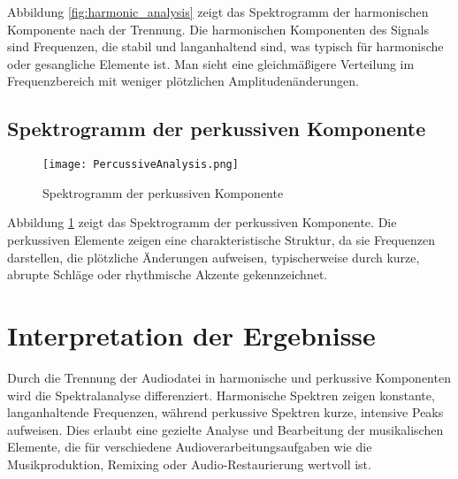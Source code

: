 Abbildung \ref{fig:harmonic_analysis} zeigt das Spektrogramm der harmonischen Komponente nach der Trennung. Die harmonischen Komponenten des Signals sind Frequenzen, die stabil und langanhaltend sind, was typisch für harmonische oder gesangliche Elemente ist. Man sieht eine gleichmäßigere Verteilung im Frequenzbereich mit weniger plötzlichen Amplitudenänderungen.

\subsection{Spektrogramm der perkussiven Komponente}

\begin{figure}[H]
    \centering
    \texttt{[image: PercussiveAnalysis.png]}
    \caption{Spektrogramm der perkussiven Komponente}
    \label{fig:percussive_analysis}
\end{figure}

Abbildung \ref{fig:percussive_analysis} zeigt das Spektrogramm der perkussiven Komponente. Die perkussiven Elemente zeigen eine charakteristische Struktur, da sie Frequenzen darstellen, die plötzliche Änderungen aufweisen, typischerweise durch kurze, abrupte Schläge oder rhythmische Akzente gekennzeichnet.

\section{Interpretation der Ergebnisse}

Durch die Trennung der Audiodatei in harmonische und perkussive Komponenten wird die Spektralanalyse differenziert. Harmonische Spektren zeigen konstante, langanhaltende Frequenzen, während perkussive Spektren kurze, intensive Peaks aufweisen. Dies erlaubt eine gezielte Analyse und Bearbeitung der musikalischen Elemente, die für verschiedene Audioverarbeitungsaufgaben wie die Musikproduktion, Remixing oder Audio-Restaurierung wertvoll ist.
